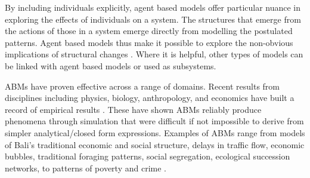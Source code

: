 By including individuals explicitly, agent based models offer particular nuance in exploring the effects of individuals on a system. The structures that emerge from the actions of those in a system emerge directly from modelling the postulated patterns. Agent based models thus make it possible to explore the non-obvious implications of structural changes \cite{darley_towards_1999, happe_agricultural_2004}. %
Where it is helpful, other types of models can be linked with agent based models or used as subsystems. %

 ABMs have proven effective across a range of domains. Recent results from disciplines including physics, biology, anthropology, and economics have built a record of empirical results \cite{parker_multi-agent_2003, helbing_social_2011-1}. These have shown ABMs reliably produce phenomena through simulation that were difficult if not impossible to derive from simpler analytical/closed form expressions.
Examples of ABMs range from models of Bali's traditional economic and social structure, delays in traffic flow, economic bubbles, 
traditional foraging patterns, %
social segregation, ecological succession networks, to patterns of poverty and crime \cite{open_agent_based_modeling_consortium_comses_????}. %
 



